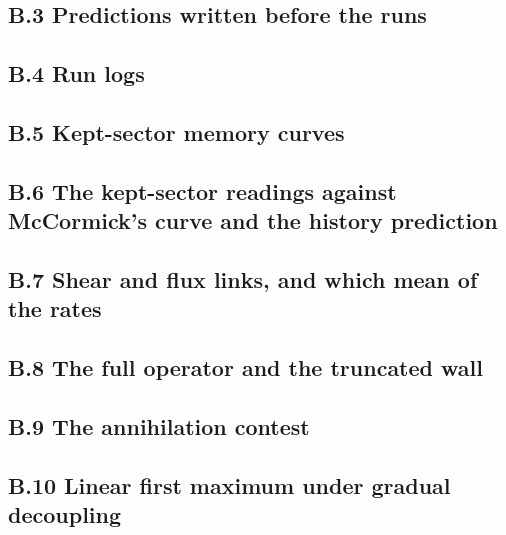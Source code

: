 \documentclass[11pt]{article}
\begin{document}
\subsection*{B.3 Predictions written before the runs}

\subsection*{B.4 Run logs}






\subsection*{B.5 Kept-sector memory curves}


\subsection*{B.6 The kept-sector readings against McCormick's curve and the history prediction}





\subsection*{B.7 Shear and flux links, and which mean of the rates}




\subsection*{B.8 The full operator and the truncated wall}


\subsection*{B.9 The annihilation contest}


\subsection*{B.10 Linear first maximum under gradual decoupling}



\end{document}
